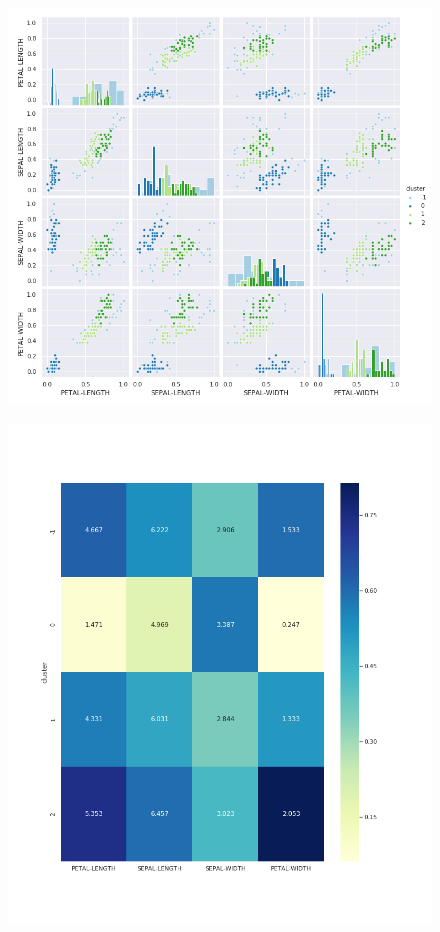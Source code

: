 \documentclass[spanish]{beamer}
\begin{document}
\begin{frame}
\begin{figure}[h]
\centering
\includegraphics[scale=0.34]{dani/scatmatrixDBSCANIRIS.png}
\end{figure}
\end{frame}

\begin{frame}
\begin{figure}[h]
\centering
\includegraphics[scale=0.29]{dani/heatmapDBSCANIRIS.png}
\end{figure}
\end{frame}
\end{document}
